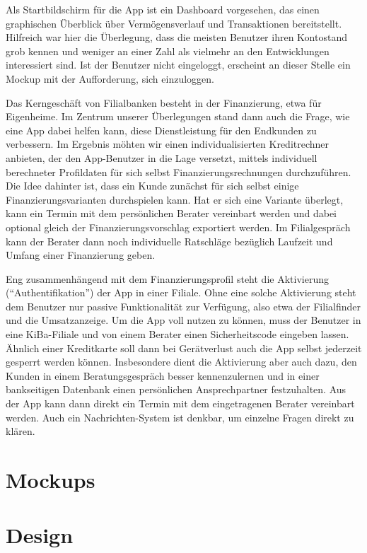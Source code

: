 \documentclass[a4paper, 12pt]{scrartcl}
\begin{document}
    Als Startbildschirm für die App ist ein Dashboard vorgesehen, das einen graphischen Überblick über Vermögensverlauf und Transaktionen bereitstellt. Hilfreich war hier die Überlegung, dass die meisten Benutzer ihren Kontostand grob kennen und weniger an einer Zahl als vielmehr an den Entwicklungen interessiert sind. Ist der Benutzer nicht eingeloggt, erscheint an dieser Stelle ein Mockup mit der Aufforderung, sich einzuloggen.
    
    Das Kerngeschäft von Filialbanken besteht in der Finanzierung, etwa für Eigenheime. Im Zentrum unserer Überlegungen stand dann auch die Frage, wie eine App dabei helfen kann, diese Dienstleistung für den Endkunden zu verbessern. Im Ergebnis möhten wir einen individualisierten Kreditrechner anbieten, der den App-Benutzer in die Lage versetzt, mittels individuell berechneter Profildaten für sich selbst Finanzierungsrechnungen durchzuführen. Die Idee dahinter ist, dass ein Kunde zunächst für sich selbst einige Finanzierungsvarianten durchspielen kann. Hat er sich eine Variante überlegt, kann ein Termin mit dem persönlichen Berater vereinbart werden und dabei optional gleich der Finanzierungsvorschlag exportiert werden. Im Filialgespräch kann der Berater dann noch individuelle Ratschläge bezüglich Laufzeit und Umfang einer Finanzierung geben.
    
	Eng zusammenhängend mit dem Finanzierungsprofil steht die Aktivierung ("`Authentifikation"') der App in einer Filiale. Ohne eine solche Aktivierung steht dem Benutzer nur passive Funktionalität zur Verfügung, also etwa der Filialfinder und die Umsatzanzeige. Um die App voll nutzen zu können, muss der Benutzer in eine KiBa-Filiale und von einem Berater einen Sicherheitscode eingeben lassen. Ähnlich einer Kreditkarte soll dann bei Gerätverlust auch die App selbst jederzeit gesperrt werden können. Insbesondere dient die Aktivierung aber auch dazu, den Kunden in einem Beratungsgespräch besser kennenzulernen und in einer bankseitigen Datenbank einen persönlichen Ansprechpartner festzuhalten. Aus der App kann dann direkt ein Termin mit dem eingetragenen Berater vereinbart werden. Auch ein Nachrichten-System ist denkbar, um einzelne Fragen direkt zu klären.
    
    
    \section{Mockups}
    
    \section{Design}
    
\end{document}
